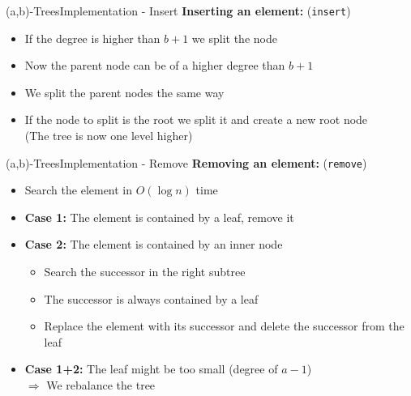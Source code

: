 
\begin{frame}{(a,b)-Trees}{Implementation - Insert}
  \textbf{Inserting an element:} (\texttt{\color{Mittel-Blau}insert})
  \begin{itemize}
    \item<2->
      If the degree is higher than {\color{Mittel-Blau}$b+1$}
      we split the node
    \item<3->
      Now the parent node can be of a higher degree than
      {\color{Mittel-Blau}$b+1$}
    \item<4->
      We {\color{Mittel-Blau}split} the parent nodes the same way
    \item<5->
      If the node to split is the root we split it and create a new root node\\
      (The tree is now one level higher)
  \end{itemize}
\end{frame}


\begin{frame}{(a,b)-Trees}{Implementation - Remove}
  \textbf{Removing an element:} (\texttt{\color{Mittel-Blau}remove})
  \begin{itemize}
    \item<2->
      Search the element in $O(\log n)$ time
    \item<3->
      \textbf{Case 1:}
      The element is contained by a leaf, remove it
    \item<4->
      \textbf{Case 2:}
      The element is contained by an inner node
      \begin{itemize}
        \item<5->
          Search the {\color{Mittel-Blau}successor} in the right subtree
        \item<6->
          The {\color{Mittel-Blau}successor} is always contained by a leaf
        \item<7->
          Replace the element with its {\color{Mittel-Blau}successor} and
          delete the {\color{Mittel-Blau}successor} from the leaf
      \end{itemize}
    \item<8->
      \textbf{Case 1+2:}
      The leaf might be too small (degree of {\color{Mittel-Blau}$a-1$})\\
      $\Rightarrow$ We {\color{Mittel-Blau}rebalance} the tree
  \end{itemize}
\end{frame}


